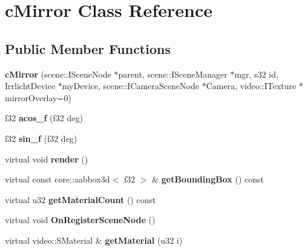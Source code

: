 \hypertarget{classc_mirror}{
\section{cMirror Class Reference}
\label{classc_mirror}
}
\subsection*{Public Member Functions}
\begin{DoxyCompactItemize}
\item 
\hypertarget{classc_mirror_a44be84d781b81bb10f8033b0dcc110b2}{
{\bfseries cMirror} (scene::ISceneNode $\ast$parent, scene::ISceneManager $\ast$mgr, s32 id, IrrlichtDevice $\ast$myDevice, scene::ICameraSceneNode $\ast$Camera, video::ITexture $\ast$mirrorOverlay=0)}
\label{classc_mirror_a44be84d781b81bb10f8033b0dcc110b2}

\item 
\hypertarget{classc_mirror_a010efc5fcfdaf202a79f53e7be53039f}{
f32 {\bfseries acos\_\-f} (f32 deg)}
\label{classc_mirror_a010efc5fcfdaf202a79f53e7be53039f}

\item 
\hypertarget{classc_mirror_a052aa2db47b9271680b7c3b9992187b9}{
f32 {\bfseries sin\_\-f} (f32 deg)}
\label{classc_mirror_a052aa2db47b9271680b7c3b9992187b9}

\item 
\hypertarget{classc_mirror_afdf64a0bf6ab8a8d2580e0c59a1a00f5}{
virtual void {\bfseries render} ()}
\label{classc_mirror_afdf64a0bf6ab8a8d2580e0c59a1a00f5}

\item 
\hypertarget{classc_mirror_a23a5b3e31fc37a7ab654acce3573565b}{
virtual const core::aabbox3d$<$ f32 $>$ \& {\bfseries getBoundingBox} () const }
\label{classc_mirror_a23a5b3e31fc37a7ab654acce3573565b}

\item 
\hypertarget{classc_mirror_abdc5e3cc6d96ea011b29c9fdc7a0d895}{
virtual u32 {\bfseries getMaterialCount} () const }
\label{classc_mirror_abdc5e3cc6d96ea011b29c9fdc7a0d895}

\item 
\hypertarget{classc_mirror_a5b2410ed63b572de8e83d2f127735ca0}{
virtual void {\bfseries OnRegisterSceneNode} ()}
\label{classc_mirror_a5b2410ed63b572de8e83d2f127735ca0}

\item 
\hypertarget{classc_mirror_ab089eccaa1c896c8543fa5cae104b469}{
virtual video::SMaterial \& {\bfseries getMaterial} (u32 i)}
\label{classc_mirror_ab089eccaa1c896c8543fa5cae104b469}


\end{DoxyCompactItemize}
